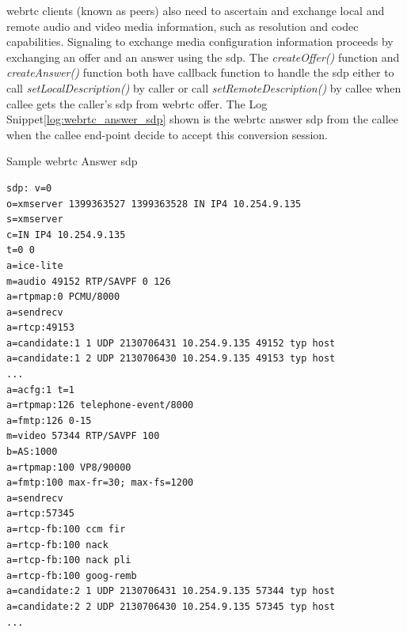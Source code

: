 \par \gls{webrtc} clients (known as peers) also need to ascertain and exchange local and remote audio and video media information, such as resolution and codec capabilities. Signaling to exchange media configuration information proceeds by exchanging an offer and an answer using the \gls{sdp}. The \textit{createOffer()} function and \textit{createAnswer()} function both have callback function to handle the \gls{sdp} either to call \textit{setLocalDescription()} by caller or call \textit{setRemoteDescription()} by callee when callee gets the caller's \gls{sdp} from \gls{webrtc} offer. The Log Snippet\ref{log:webrtc_answer_sdp} shown is the \gls{webrtc} answer \gls{sdp} from the callee when the callee end-point decide to accept this conversion session.

\begin{algorithm}[h]
  \caption{Sample \gls{webrtc} Answer \gls{sdp}}
  \label{log:webrtc_answer_sdp}
  \begin{verbatim}
sdp: v=0
o=xmserver 1399363527 1399363528 IN IP4 10.254.9.135
s=xmserver
c=IN IP4 10.254.9.135
t=0 0
a=ice-lite
m=audio 49152 RTP/SAVPF 0 126
a=rtpmap:0 PCMU/8000
a=sendrecv
a=rtcp:49153
a=candidate:1 1 UDP 2130706431 10.254.9.135 49152 typ host
a=candidate:1 2 UDP 2130706430 10.254.9.135 49153 typ host
...
a=acfg:1 t=1
a=rtpmap:126 telephone-event/8000
a=fmtp:126 0-15
m=video 57344 RTP/SAVPF 100
b=AS:1000
a=rtpmap:100 VP8/90000
a=fmtp:100 max-fr=30; max-fs=1200
a=sendrecv
a=rtcp:57345
a=rtcp-fb:100 ccm fir
a=rtcp-fb:100 nack
a=rtcp-fb:100 nack pli
a=rtcp-fb:100 goog-remb
a=candidate:2 1 UDP 2130706431 10.254.9.135 57344 typ host
a=candidate:2 2 UDP 2130706430 10.254.9.135 57345 typ host
...
 \end{verbatim}
\end{algorithm}
